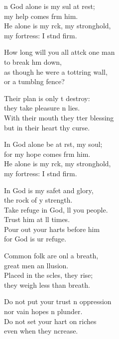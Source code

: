 \settowidth{\versewidth}{How long will you all attack one man *}
\begin{psalmverse}%
  \begin{patverse}
n God alone is my sul at rest;\Med\\
my help comes frm him.\\
He alone is my rck, my stronghold,\Med\\
my fortress: I stnd firm.

How long will you all attck one man\Med\\
to break h\pointup{\i}m down,\\
as though he were a tottring wall,\Med\\
or a tumbl\pointup{\i}ng fence?

Their plan is only t destroy:\Med\\
they take pleasure \pointup{\i}n lies.\\
With their mouth they tter blessing\Med\\
but in their heart thy curse.

In God alone be at rst, my soul;\Med\\
for my hope comes frm him.\\
He alone is my rck, my stronghold,\Med\\
my fortress: I stnd firm.

In God is my safet and glory,\Med\\
the rock of y strength.\\
Take refuge in God, ll you people.\Med\\
Trust him at ll times.\\
Pour out your harts before him\Med\\
for God is ur refuge.

Common folk are onl a breath,\Med\\
great men an \pointup{\i}llusion.\\
Placed in the scles, they rise;\Med\\
they weigh less than  breath.

Do not put your trust \pointup{\i}n oppression\Med\\
nor vain hopes n plunder.\\
Do not set your hart on riches\Med\\
even when they \pointup{\i}ncrease.


\end{patverse}
\end{psalmverse}
